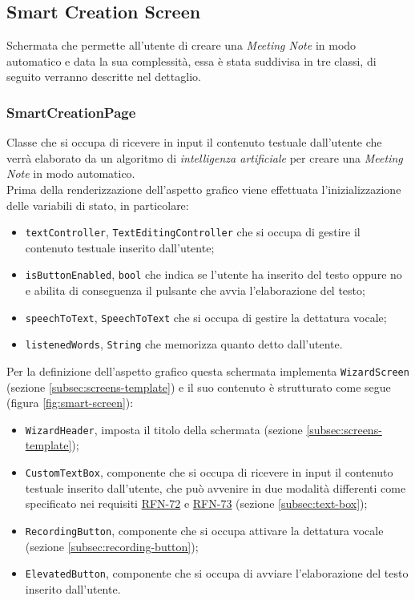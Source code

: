 \subsection{Smart Creation Screen}
\label{subsec:smart-creation-screen}

Schermata che permette all'utente di creare una \emph{Meeting Note} in modo automatico e data la sua complessità, essa è stata suddivisa in tre classi, di seguito verranno descritte nel dettaglio. 

\subsubsection*{SmartCreationPage}
\label{subsubsec:smart-creation-page}

Classe che si occupa di ricevere in input il contenuto testuale dall'utente che verrà elaborato da un algoritmo di \emph{intelligenza artificiale} per creare una \emph{Meeting Note} in modo automatico. \\
Prima della renderizzazione dell'aspetto grafico viene effettuata l'inizializzazione delle variabili di stato, in particolare:
\begin{itemize}
    \item \lstinline{textController}, \lstinline{TextEditingController}\cite{site:text-editing-controller} che si occupa di gestire il contenuto testuale inserito dall'utente;
    \item \lstinline{isButtonEnabled}, \lstinline{bool} che indica se l'utente ha inserito del testo oppure no e abilita di conseguenza il pulsante che avvia l'elaborazione del testo;
    \item \lstinline{speechToText}, \lstinline{SpeechToText}\cite{site:speech-to-text} che si occupa di gestire la dettatura vocale;
    \item \lstinline{listenedWords}, \lstinline{String} che memorizza quanto detto dall'utente.
\end{itemize}
Per la definizione dell'aspetto grafico questa schermata implementa \lstinline{WizardScreen} (sezione \ref{subsec:screens-template}) e il suo contenuto è strutturato come segue (figura \ref{fig:smart-screen}):
\begin{itemize}
    \item \lstinline{WizardHeader}, imposta il titolo della schermata (sezione \ref{subsec:screens-template});
    \item \lstinline{CustomTextBox}, componente che si occupa di ricevere in input il contenuto testuale inserito dall'utente, che può avvenire in due modalità differenti come specificato nei requisiti \hyperref[RFN-72]{RFN-72} e \hyperref[RFN-73]{RFN-73} (sezione \ref{subsec:text-box});
    \item \lstinline{RecordingButton}, componente che si occupa attivare la dettatura vocale (sezione \ref{subsec:recording-button});
    \item \lstinline{ElevatedButton}\cite{site:elevated-button}, componente che si occupa di avviare l'elaborazione del testo inserito dall'utente.
\end{itemize}
